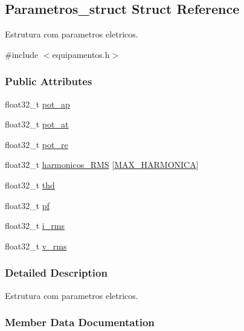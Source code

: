 \hypertarget{struct_parametros__struct}{}\subsection{Parametros\+\_\+struct Struct Reference}
\label{struct_parametros__struct}


Estrutura com parametros eletricos.  




{\ttfamily \#include $<$equipamentos.\+h$>$}

\subsubsection*{Public Attributes}
\begin{DoxyCompactItemize}
\item 
float32\+\_\+t \hyperlink{struct_parametros__struct_adec264c670000b4c0e9800b0108c5699}{pot\+\_\+ap}
\item 
float32\+\_\+t \hyperlink{struct_parametros__struct_a3d0c5f9ddb038dabbedfb9132bcb11dc}{pot\+\_\+at}
\item 
float32\+\_\+t \hyperlink{struct_parametros__struct_ad0b178bff9c6d8a10b0923cdb31a54c7}{pot\+\_\+re}
\item 
float32\+\_\+t \hyperlink{struct_parametros__struct_a17270f8b730ff4430705119649e19f2f}{harmonicos\+\_\+\+R\+MS} \mbox{[}\hyperlink{defines_8h_a21e24b95b94f5365ae4b50fc716a838d}{M\+A\+X\+\_\+\+H\+A\+R\+M\+O\+N\+I\+CA}\mbox{]}
\item 
float32\+\_\+t \hyperlink{struct_parametros__struct_a70338ea8566d2c1ac4948eb1bc20a7ee}{thd}
\item 
float32\+\_\+t \hyperlink{struct_parametros__struct_affeeb0dc00d043668cea3bd21837f29e}{pf}
\item 
float32\+\_\+t \hyperlink{struct_parametros__struct_af37fe6a03ae96a79b0274dee81ef024d}{i\+\_\+rms}
\item 
float32\+\_\+t \hyperlink{struct_parametros__struct_a7f95700e6a3755a1716cb194dfa53c87}{v\+\_\+rms}
\end{DoxyCompactItemize}


\subsubsection{Detailed Description}
Estrutura com parametros eletricos. 

\subsubsection{Member Data Documentation}
\mbox{\label{struct_parametros__struct_a17270f8b730ff4430705119649e19f2f}} 
